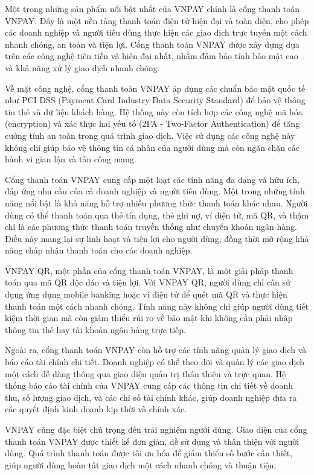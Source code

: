 \documentclass[../DoAn.tex]{subfiles}
\begin{document}
Một trong những sản phẩm nổi bật nhất của VNPAY chính là cổng thanh toán VNPAY. Đây là một nền tảng thanh toán điện tử hiện đại và toàn diện, cho phép các doanh nghiệp và người tiêu dùng thực hiện các giao dịch trực tuyến một cách nhanh chóng, an toàn và tiện lợi. Cổng thanh toán VNPAY được xây dựng dựa trên các công nghệ tiên tiến và hiện đại nhất, nhằm đảm bảo tính bảo mật cao và khả năng xử lý giao dịch nhanh chóng.

Về mặt công nghệ, cổng thanh toán VNPAY áp dụng các chuẩn bảo mật quốc tế như PCI DSS (Payment Card Industry Data Security Standard) để bảo vệ thông tin thẻ và dữ liệu khách hàng. Hệ thống này còn tích hợp các công nghệ mã hóa (encryption) và xác thực hai yếu tố (2FA - Two-Factor Authentication) để tăng cường tính an toàn trong quá trình giao dịch. Việc sử dụng các công nghệ này không chỉ giúp bảo vệ thông tin cá nhân của người dùng mà còn ngăn chặn các hành vi gian lận và tấn công mạng.

Cổng thanh toán VNPAY cung cấp một loạt các tính năng đa dạng và hữu ích, đáp ứng nhu cầu của cả doanh nghiệp và người tiêu dùng. Một trong những tính năng nổi bật là khả năng hỗ trợ nhiều phương thức thanh toán khác nhau. Người dùng có thể thanh toán qua thẻ tín dụng, thẻ ghi nợ, ví điện tử, mã QR, và thậm chí là các phương thức thanh toán truyền thống như chuyển khoản ngân hàng. Điều này mang lại sự linh hoạt và tiện lợi cho người dùng, đồng thời mở rộng khả năng chấp nhận thanh toán cho các doanh nghiệp.

VNPAY QR, một phần của cổng thanh toán VNPAY, là một giải pháp thanh toán qua mã QR độc đáo và tiện lợi. Với VNPAY QR, người dùng chỉ cần sử dụng ứng dụng mobile banking hoặc ví điện tử để quét mã QR và thực hiện thanh toán một cách nhanh chóng. Tính năng này không chỉ giúp người dùng tiết kiệm thời gian mà còn giảm thiểu rủi ro về bảo mật khi không cần phải nhập thông tin thẻ hay tài khoản ngân hàng trực tiếp.

Ngoài ra, cổng thanh toán VNPAY còn hỗ trợ các tính năng quản lý giao dịch và báo cáo tài chính chi tiết. Doanh nghiệp có thể theo dõi và quản lý các giao dịch một cách dễ dàng thông qua giao diện quản trị thân thiện và trực quan. Hệ thống báo cáo tài chính của VNPAY cung cấp các thông tin chi tiết về doanh thu, số lượng giao dịch, và các chỉ số tài chính khác, giúp doanh nghiệp đưa ra các quyết định kinh doanh kịp thời và chính xác.

VNPAY cũng đặc biệt chú trọng đến trải nghiệm người dùng. Giao diện của cổng thanh toán VNPAY được thiết kế đơn giản, dễ sử dụng và thân thiện với người dùng. Quá trình thanh toán được tối ưu hóa để giảm thiểu số bước cần thiết, giúp người dùng hoàn tất giao dịch một cách nhanh chóng và thuận tiện.
\end{document}
